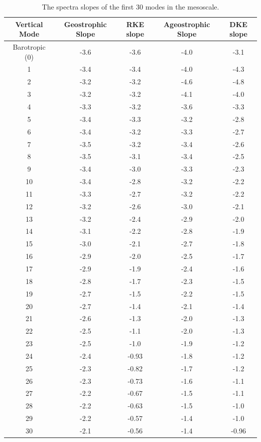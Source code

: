 \begin{table}[H]
\begin{tabular}{c c c c c}
\hline
\textbf{Vertical Mode} & \textbf{Geostrophic Slope} & \textbf{RKE slope} & \textbf{Ageostrophic Slope} & \textbf{DKE slope}\\
\hline
Barotropic (0) & -3.6 & -3.6 & -4.0 & -3.1 \\
1 & -3.4 & -3.4 & -4.0 & -4.3\\
2 & -3.2 & -3.2 & -4.6 & -4.8\\
3 & -3.2 & -3.2 & -4.1 & -4.0\\
4 & -3.3 & -3.2 & -3.6 & -3.3\\
5 & -3.4 & -3.3 & -3.2 & -2.8\\
6 & -3.4 & -3.2 & -3.3 & -2.7\\
7 & -3.5 & -3.2 & -3.4 & -2.6 \\
8 & -3.5 & -3.1 & -3.4 & -2.5 \\
9 & -3.4 & -3.0 & -3.3 & -2.3 \\
10 & -3.4 & -2.8 & -3.2 & -2.2 \\
11 & -3.3 & -2.7 & -3.2 & -2.2 \\
12 & -3.2 & -2.6 & -3.0 & -2.1\\
13 & -3.2 & -2.4 & -2.9 & -2.0 \\
14 & -3.1 & -2.2 & -2.8 & -1.9\\
15 & -3.0 & -2.1 & -2.7 & -1.8\\
16 & -2.9 & -2.0 & -2.5 & -1.7\\
17 & -2.9 & -1.9 & -2.4 & -1.6\\
18 & -2.8 & -1.7 & -2.3 & -1.5\\
19 & -2.7 & -1.5 & -2.2 & -1.5\\
20 & -2.7 & -1.4 & -2.1 & -1.4\\
21 & -2.6 & -1.3 & -2.0 & -1.3\\
22 & -2.5 & -1.1 & -2.0 & -1.3\\
23 & -2.5 & -1.0 & -1.9 & -1.2\\
24 & -2.4 & -0.93 & -1.8 & -1.2\\
25 & -2.3 & -0.82 & -1.7 & -1.2\\
26 & -2.3 & -0.73 & -1.6 & -1.1\\
27 & -2.2 & -0.67 & -1.5 & -1.1\\
28 & -2.2 & -0.63 & -1.5 & -1.0\\
29 & -2.2 & -0.57 & -1.4 & -1.0 \\
30 & -2.1 & -0.56 & -1.4 & -0.96\\
\hline
\end{tabular}
\caption{The spectra slopes of the first 30 modes in the mesoscale.}
\label{tab:slopes}
\end{table}

